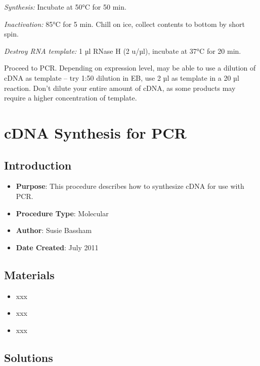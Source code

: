 \documentclass[
  letterpaper,
  DIV=11,
  numbers=noendperiod]{scrreprt}
\begin{document}
\emph{Synthesis:} Incubate at 50°C for 50 min.

\emph{Inactivation:} 85°C for 5 min. Chill on ice, collect contents to
bottom by short spin.

\emph{Destroy RNA template:} 1 µl RNase H (2 u/µl), incubate at 37°C for
20 min.

Proceed to PCR. Depending on expression level, may be able to use a
dilution of cDNA as template -- try 1:50 dilution in EB, use 2 µl as
template in a 20 µl reaction. Don't dilute your entire amount of cDNA,
as some products may require a higher concentration of template.

\hypertarget{sec-molecular-cDNA_synth_PCR}{%
\chapter{cDNA Synthesis for PCR}\label{sec-molecular-cDNA_synth_PCR}}

\hypertarget{introduction-11}{%
\section{Introduction}\label{introduction-11}}

\begin{itemize}
\item
  \textbf{Purpose}: This procedure describes how to synthesize cDNA for
  use with PCR.
\item
  \textbf{Procedure Type}: Molecular
\item
  \textbf{Author}: Susie Bassham
\item
  \textbf{Date Created}: July 2011
\end{itemize}

\hypertarget{materials-11}{%
\section{Materials}\label{materials-11}}

\begin{itemize}
\item
  xxx
\item
  xxx
\item
  xxx
\end{itemize}

\hypertarget{solutions-11}{%
\section{Solutions}\label{solutions-11}}
\end{document}
